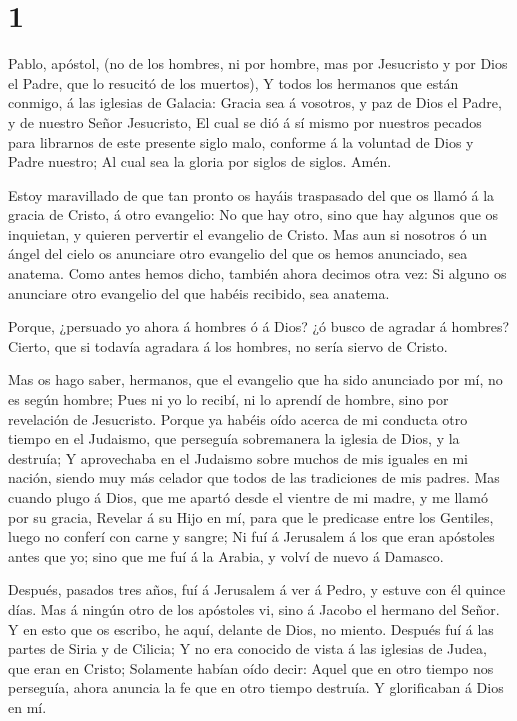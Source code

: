\hypertarget{section}{%
\section{1}\label{section}}

 Pablo, apóstol, (no de los hombres, ni por hombre, mas por
Jesucristo y por Dios el Padre, que lo resucitó de los muertos),
 Y todos los hermanos que están conmigo, á las iglesias de
Galacia:  Gracia sea á vosotros, y paz de Dios el Padre, y
de nuestro Señor Jesucristo,  El cual se dió á sí mismo por
nuestros pecados para librarnos de este presente siglo malo, conforme á
la voluntad de Dios y Padre nuestro;  Al cual sea la gloria
por siglos de siglos. Amén.

 Estoy maravillado de que tan pronto os hayáis traspasado
del que os llamó á la gracia de Cristo, á otro evangelio: 
No que hay otro, sino que hay algunos que os inquietan, y quieren
pervertir el evangelio de Cristo.  Mas aun si nosotros ó un
ángel del cielo os anunciare otro evangelio del que os hemos anunciado,
sea anatema.  Como antes hemos dicho, también ahora decimos
otra vez: Si alguno os anunciare otro evangelio del que habéis recibido,
sea anatema.

 Porque, ¿persuado yo ahora á hombres ó á Dios? ¿ó busco de
agradar á hombres? Cierto, que si todavía agradara á los hombres, no
sería siervo de Cristo.

 Mas os hago saber, hermanos, que el evangelio que ha sido
anunciado por mí, no es según hombre;  Pues ni yo lo
recibí, ni lo aprendí de hombre, sino por revelación de Jesucristo.
 Porque ya habéis oído acerca de mi conducta otro tiempo en
el Judaismo, que perseguía sobremanera la iglesia de Dios, y la
destruía;  Y aprovechaba en el Judaismo sobre muchos de mis
iguales en mi nación, siendo muy más celador que todos de las
tradiciones de mis padres.  Mas cuando plugo á Dios, que me
apartó desde el vientre de mi madre, y me llamó por su gracia,
 Revelar á su Hijo en mí, para que le predicase entre los
Gentiles, luego no conferí con carne y sangre;  Ni fuí á
Jerusalem á los que eran apóstoles antes que yo; sino que me fuí á la
Arabia, y volví de nuevo á Damasco.

 Después, pasados tres años, fuí á Jerusalem á ver á Pedro,
y estuve con él quince días.  Mas á ningún otro de los
apóstoles vi, sino á Jacobo el hermano del Señor.  Y en
esto que os escribo, he aquí, delante de Dios, no miento. 
Después fuí á las partes de Siria y de Cilicia;  Y no era
conocido de vista á las iglesias de Judea, que eran en Cristo;
 Solamente habían oído decir: Aquel que en otro tiempo nos
perseguía, ahora anuncia la fe que en otro tiempo destruía.
 Y glorificaban á Dios en mí.

